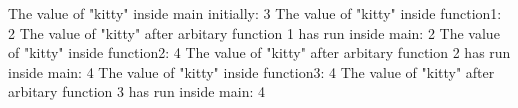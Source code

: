The value of "kitty" inside main initially: 3
The value of "kitty" inside function1: 2
The value of  "kitty" after arbitary function 1 has run inside main: 2
The value of "kitty" inside function2: 4
The value of  "kitty" after arbitary function 2 has run inside main: 4
The value of "kitty" inside function3: 4
The value of  "kitty" after arbitary function 3 has run inside main: 4
